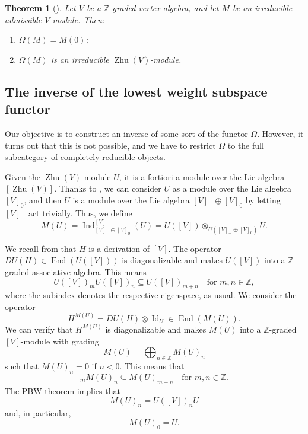 \documentclass[a4paper, 12pt, reqno]{amsart}
\newtheorem{theorem}{Theorem}[section]
\theoremstyle{remark}
\DeclareMathOperator{\Id}{Id}
\DeclareMathOperator{\End}{End}
\DeclareMathOperator{\Ind}{Ind}
\DeclareMathOperator{\Zhu}{Zhu}
\begin{document}
\begin{theorem}[{\cite[Proposition 5.4]{dong_twisted_1998}}]
  \label{thr:38}
  Let $V$ be a $\mathbb{Z}$-graded vertex algebra, and let $M$ be an irreducible admissible $V$-module.
  Then:
  \begin{enumerate}
  \item $\Omega(M) = M(0)$;
  \item $\Omega(M)$ is an irreducible $\Zhu(V)$-module.
  \end{enumerate}
\end{theorem}

\subsection{The inverse of the lowest weight subspace functor}
\label{sec:inverse-lowes-weight}

Our objective is to construct an inverse of some sort of the functor $\Omega$.
However, it turns out that this is not possible, and we have to restrict $\Omega$ to the full subcategory of completely reducible objects.

Given the $\Zhu(V)$-module $U$, it is a fortiori a module over the Lie algebra $[\Zhu(V)]$.
Thanks to , we can consider $U$ as a module over the Lie algebra $[V]_0$, and then $U$ is a module over the Lie algebra $[V]_- \oplus [V]_0$ by letting $[V]_-$ act trivially.
Thus, we define
\begin{equation*}
  M(U) = \Ind^{[V]}_{[V]_- \oplus [V]_0}(U) = U([V]) \otimes_{U([V]_- \oplus [V]_0)} U.
\end{equation*}

We recall from  that $H$ is a derivation of $[V]$.
The operator $DU(H) \in \End(U([V]))$ is diagonalizable and makes $U([V])$ into a $\mathbb{Z}$-graded associative algebra.
This means
\begin{equation*}
  U([V])_mU([V])_n \subseteq U([V])_{m + n} \quad \text{for $m, n \in \mathbb{Z}$},
\end{equation*}
where the subindex denotes the respective eigenspace, as usual.
We consider the operator
\begin{equation*}
  H^{M(U)} = DU(H)\otimes\Id_U \in \End(M(U)).
\end{equation*}
We can verify that $H^{M(U)}$ is diagonalizable and makes $M(U)$ into a $\mathbb{Z}$-graded $[V]$-module with grading
\begin{equation*}
  M(U) = \bigoplus_{n \in \mathbb{Z}}M(U)_n
\end{equation*}
such that $M(U)_n = 0$ if $n < 0$.
This means that
\begin{equation*}
  [V]_mM(U)_n \subseteq M(U)_{m + n} \quad \text{for $m, n \in \mathbb{Z}$}.
\end{equation*}
The PBW theorem implies that
\begin{equation*}
  M(U)_n = U([V])_nU
\end{equation*}
and, in particular,
\begin{equation*}
  M(U)_0 = U.
\end{equation*}
\end{document}

